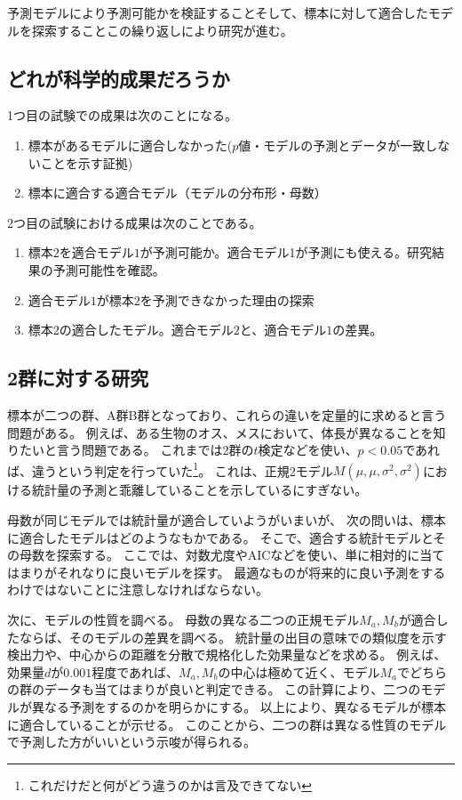 予測モデルにより予測可能かを検証することそして、標本に対して適合したモデルを探索することこの繰り返しにより研究が進む。

\subsection{どれが科学的成果だろうか}
1つ目の試験での成果は次のことになる。
\begin{enumerate}
    \item 標本があるモデルに適合しなかった($p$値・モデルの予測とデータが一致しないことを示す証拠)
    \item 標本に適合する適合モデル（モデルの分布形・母数）
\end{enumerate}

2つ目の試験における成果は次のことである。
\begin{enumerate}
    \item 標本$2$を適合モデル$1$が予測可能か。適合モデル1が予測にも使える。研究結果の予測可能性を確認。
    \item 適合モデル$1$が標本$2$を予測できなかった理由の探索
    \item 標本$2$の適合したモデル。適合モデル$2$と、適合モデル$1$の差異。
\end{enumerate}



\subsection{2群に対する研究}
標本が二つの群、A群B群となっており、これらの違いを定量的に求めると言う問題がある。
例えば、ある生物のオス、メスにおいて、体長が異なることを知りたいと言う問題である。
これまでは2群の$t$検定などを使い、$p<0.05$であれば、違うという判定を行っていた\footnote{これだけだと何がどう違うのかは言及できてない}。
これは、正規2モデル$M(\mu,\mu,\sigma^2,\sigma^2)$における統計量の予測と乖離していることを示しているにすぎない。

母数が同じモデルでは統計量が適合していようがいまいが、
次の問いは、標本に適合したモデルはどのようなもかである。
そこで、適合する統計モデルとその母数を探索する。
ここでは、対数尤度やAICなどを使い、単に相対的に当てはまりがそれなりに良いモデルを探す。
最適なものが将来的に良い予測をするわけではないことに注意しなければならない。

次に、モデルの性質を調べる。
母数の異なる二つの正規モデル$M_a,M_b$が適合したならば、そのモデルの差異を調べる。
統計量の出目の意味での類似度を示す検出力や、中心からの距離を分散で規格化した効果量などを求める。
例えば、効果量$d$が$0.001$程度であれば、$M_a,M_b$の中心は極めて近く、モデル$M_a$でどちらの群のデータも当てはまりが良いと判定できる。
この計算により、二つのモデルが異なる予測をするのかを明らかにする。
以上により、異なるモデルが標本に適合していることが示せる。
このことから、二つの群は異なる性質のモデルで予測した方がいいという示唆が得られる。

